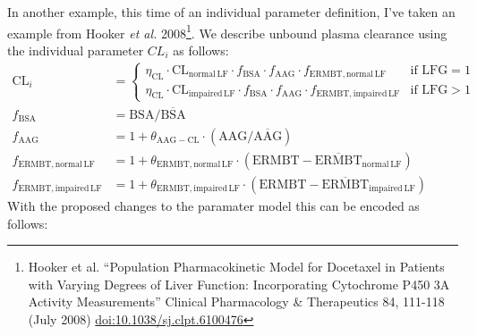 \documentclass[a4paper,11pt]{article}
\begin{document}
In another example, this time of an individual parameter definition,
I've taken an example from Hooker \emph{et al.} 2008\footnote{ Hooker
  et al. ``Population Pharmacokinetic Model for Docetaxel in Patients
  with Varying Degrees of Liver Function: Incorporating Cytochrome
  P450 3A Activity Measurements'' Clinical Pharmacology \& Therapeutics
  84, 111-118 (July 2008) \textbar
  \url{doi:10.1038/sj.clpt.6100476}}. We describe unbound plasma
clearance using the individual parameter $\mathit{CL}_i$ as follows:
%
\begin{align*}
\mathrm{CL}_i &=
\begin{cases}
\eta_{\mathrm{CL}} \cdot \mathrm{CL}_{\mathrm{normal\, LF}} \cdot f_{\mathrm{BSA}} \cdot
f_{\mathrm{AAG}} \cdot f_{\mathrm{ERMBT, normal\, LF}} & \text{if } \mathrm{LFG} = 1\\
\eta_{\mathrm{CL}} \cdot \mathrm{CL}_{\mathrm{impaired\, LF}} \cdot f_{\mathrm{BSA}} \cdot
f_{\mathrm{AAG}} \cdot f_{\mathrm{ERMBT, impaired\, LF}} & \text{if } \mathrm{LFG}
> 1
\end{cases}\\
f_{\mathrm{BSA}} &= \mathrm{BSA} / \overline{\mathrm{BSA}}\\
f_{\mathrm{AAG}} &= 1 + \theta_{\mathrm{AAG-CL}} \cdot \left(\mathrm{AAG} / \overline{\mathrm{AAG}}\right)\\
f_{\mathrm{ERMBT, normal\, LF}} &= 1 + \theta_{\mathrm{ERMBT, normal\, LF}} \cdot
\left(\mathrm{ERMBT} - \overline{\mathrm{ERMBT}}_{\mathrm{normal\, LF}}\right)\\
f_{\mathrm{ERMBT, impaired\, LF}} &= 1 + \theta_{\mathrm{ERMBT, impaired\, LF}} \cdot
\left(\mathrm{ERMBT} - \overline{\mathrm{ERMBT}}_{\mathrm{impaired\, LF}}\right)
\end{align*}
%
With the proposed changes to the paramater model this can be encoded
as follows:
%
\end{document}
